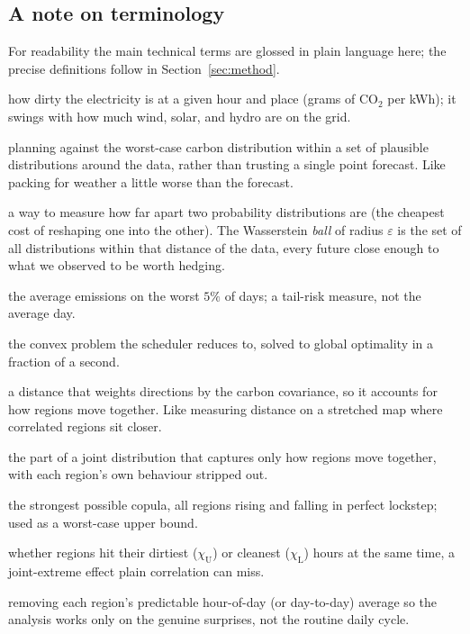 \documentclass[12pt]{article}
\newcommand{\CVaR}{\mathrm{CVaR}}
\newcommand{\chiU}{\chi_{\mathrm{U}}}
\newcommand{\chiL}{\chi_{\mathrm{L}}}
\begin{document}
\subsection{A note on terminology}
For readability the main technical terms are glossed in plain language here; the precise
definitions follow in Section~\ref{sec:method}.
\begin{description}[leftmargin=1.4em,itemsep=1pt]
\item[Carbon intensity:] how dirty the electricity is at a given hour and place (grams of CO$_2$ per kWh); it swings with how much wind, solar, and hydro are on the grid.
\item[Distributionally robust optimization (DRO):] planning against the worst-case carbon
distribution within a set of plausible distributions around the data, rather than
trusting a single point forecast. Like packing for weather a little worse than the forecast.
\item[Wasserstein distance / ball:] a way to measure how far apart two probability distributions are (the cheapest cost of reshaping one into the other). The Wasserstein \emph{ball} of radius $\varepsilon$ is the set of all distributions within that distance of the data, every future close enough to what we observed to be worth hedging.
\item[$\CVaR_{0.95}$ (Conditional Value-at-Risk):] the average emissions on the worst
$5\%$ of days; a tail-risk measure, not the average day.
\item[Second-order cone program (SOCP):] the convex problem the scheduler reduces to,
solved to global optimality in a fraction of a second.
\item[Mahalanobis distance:] a distance that weights directions by the carbon covariance, so it accounts for how regions move together. Like measuring distance on a stretched map where correlated regions sit closer.
\item[Copula:] the part of a joint distribution that captures only how regions move together, with each region's own behaviour stripped out.
\item[Comonotone:] the strongest possible copula, all regions rising and falling in perfect lockstep; used as a worst-case upper bound.
\item[Tail dependence ($\chiU,\chiL$):] whether regions hit their dirtiest ($\chiU$) or cleanest ($\chiL$) hours at the same time, a joint-extreme effect plain correlation can miss.
\item[Residualization:] removing each region's predictable hour-of-day (or day-to-day) average so the analysis works only on the genuine surprises, not the routine daily cycle.

\end{description}
\end{document}
